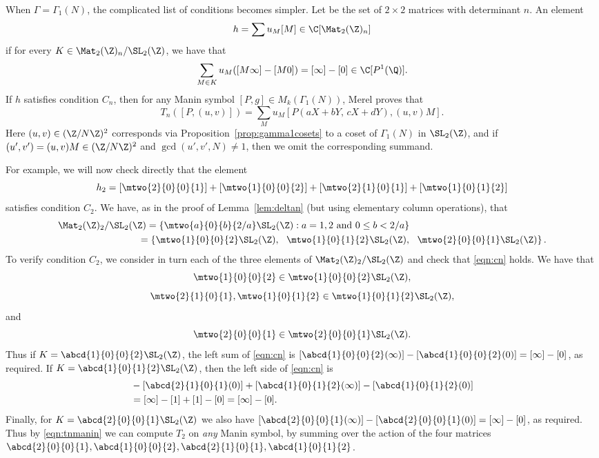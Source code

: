 When $\Gamma=\Gamma_1(N)$, the complicated list of conditions becomes
simpler.    Let  be the set of $2\times 2$
matrices with determinant $n$.  
An element
$$
  h = \sum u_M [M] \in \C[\Mat_2(\Z)_n]
$$
if for every $K\in \Mat_2(\Z)_n / \SL_2(\Z)$, we have that 
\begin{equation}\label{eqn:cn}
  \sum_{M \in K} u_M([M\infty] - [M 0 ]) = [\infty] - [0]
\in \C[P^1(\Q)].
\end{equation}
If $h$ satisfies condition $C_n$, then for any Manin symbol
$[P,g] \in M_k(\Gamma_1(N))$, Merel proves that
\begin{equation}\label{eqn:tnmanin}
  T_n([P,(u,v)]) = \sum_{M} u_M [P(aX+bY, \, cX+dY), (u,v)M].
\end{equation}
Here $(u,v)\in (\Z/N\Z)^2$ corresponds via Proposition~\ref{prop:gamma1cosets}
to a coset of $\Gamma_1(N)$ in $\SL_2(\Z)$, and
if $(u',v')=(u,v)M \in (\Z/N\Z)^2$ and $\gcd(u',v',N)\neq 1$,
then we omit the corresponding summand.

For example, we will now check directly that the element
$$
 h_2 =  \left[\mtwo{2}{0}{0}{1}\right] + 
        \left[\mtwo{1}{0}{0}{2}\right] + 
        \left[\mtwo{2}{1}{0}{1}\right] + 
        \left[\mtwo{1}{0}{1}{2}\right]
$$
satisfies condition $C_2$. 
We have, as in the proof of Lemma~\ref{lem:deltan}
(but using elementary column operations), that
\begin{align*}
  \Mat_2(\Z)_2/\SL_2(\Z) &= \left\{
\mtwo{a}{0}{b}{2/a} \SL_2(\Z) : a=1,2\text{ and }0\leq b < 2/a
\right\} \\
&\hspace{-2ex}= \left\{ \mtwo{1}{0}{0}{2} \SL_2(\Z),\,\,\,\,
       \mtwo{1}{0}{1}{2} \SL_2(\Z),\,\,\,\,
      \mtwo{2}{0}{0}{1} \SL_2(\Z) \right\}.
  \end{align*}
To verify condition $C_2$, we consider in turn each of the three
elements of $\Mat_2(\Z)_2/\SL_2(\Z)$ and check that \eqref{eqn:cn}
holds.  We have that 
$$
\mtwo{1}{0}{0}{2} \in \mtwo{1}{0}{0}{2} \SL_2(\Z),
$$
$$
\mtwo{2}{1}{0}{1}, \mtwo{1}{0}{1}{2} \in \mtwo{1}{0}{1}{2} \SL_2(\Z),
$$
and
$$
\mtwo{2}{0}{0}{1}\in \mtwo{2}{0}{0}{1} \SL_2(\Z).
$$
Thus if $K = \abcd{1}{0}{0}{2}\SL_2(\Z)$, the left
sum of \eqref{eqn:cn} is 
$[\abcd{1}{0}{0}{2}(\infty)] - [\abcd{1}{0}{0}{2}(0)]  = [\infty]-[0]$,
as required.  If $K=\abcd{1}{0}{1}{2} \SL_2(\Z)$, then
the left side of \eqref{eqn:cn} is 
\begin{align*}
[\abcd{2}{1}{0}{1}(\infty)] &- [\abcd{2}{1}{0}{1}(0)] 
 + [\abcd{1}{0}{1}{2}(\infty)] - [\abcd{1}{0}{1}{2}(0)] \\
  &= [\infty] - [1] + [1] - [0] = [\infty] - [0].
\end{align*}
Finally, for $K = \abcd{2}{0}{0}{1}\SL_2(\Z)$
we also have
$[\abcd{2}{0}{0}{1}(\infty)] - [\abcd{2}{0}{0}{1}(0)]  = [\infty]-[0]$,
as required.
Thus by \eqref{eqn:tnmanin} we can compute $T_2$ on {\em any} Manin
symbol, by summing over the action 
 of the four matrices
$\abcd{2}{0}{0}{1}, \abcd{1}{0}{0}{2}, 
\abcd{2}{1}{0}{1}, \abcd{1}{0}{1}{2}$.

